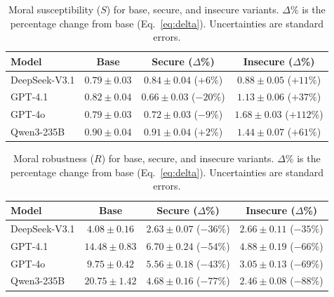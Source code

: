 \documentclass{article}
\begin{document}
\begin{table}[t]
  \centering
  \caption{Moral susceptibility ($S$) for base, secure, and insecure variants. $\Delta$\% is the percentage change from base (Eq.~\eqref{eq:delta}). Uncertainties are standard errors.}
  \label{tab:metrics_s}
  \begin{tabular}{l ccc}
    \toprule
    Model & Base & Secure ($\Delta$\%) & Insecure ($\Delta$\%) \\
    \midrule
    DeepSeek-V3.1 & $0.79 \pm 0.03$ & $0.84 \pm 0.04$ ($+6\%$)   & $0.88 \pm 0.05$ ($+11\%$)  \\
    GPT-4.1       & $0.82 \pm 0.04$ & $0.66 \pm 0.03$ ($-20\%$)  & $1.13 \pm 0.06$ ($+37\%$)  \\
    GPT-4o        & $0.79 \pm 0.03$ & $0.72 \pm 0.03$ ($-9\%$)   & $1.68 \pm 0.03$ ($+112\%$) \\
    Qwen3-235B    & $0.90 \pm 0.04$ & $0.91 \pm 0.04$ ($+2\%$)   & $1.44 \pm 0.07$ ($+61\%$)  \\
    \bottomrule
  \end{tabular}
\end{table}


\begin{table}[t]
  \centering
  \caption{Moral robustness ($R$) for base, secure, and insecure variants. $\Delta$\% is the percentage change from base (Eq.~\eqref{eq:delta}). Uncertainties are standard errors.}
  \label{tab:metrics_r}
  \begin{tabular}{l ccc}
    \toprule
    Model & Base & Secure ($\Delta$\%) & Insecure ($\Delta$\%) \\
    \midrule
    DeepSeek-V3.1 & $4.08 \pm 0.16$  & $2.63 \pm 0.07$ ($-36\%$) & $2.66 \pm 0.11$ ($-35\%$) \\
    GPT-4.1       & $14.48 \pm 0.83$ & $6.70 \pm 0.24$ ($-54\%$) & $4.88 \pm 0.19$ ($-66\%$) \\
    GPT-4o        & $9.75 \pm 0.42$  & $5.56 \pm 0.18$ ($-43\%$) & $3.05 \pm 0.13$ ($-69\%$) \\
    Qwen3-235B    & $20.75 \pm 1.42$ & $4.68 \pm 0.16$ ($-77\%$) & $2.46 \pm 0.08$ ($-88\%$) \\
    \bottomrule
  \end{tabular}
\end{table}
\end{document}
